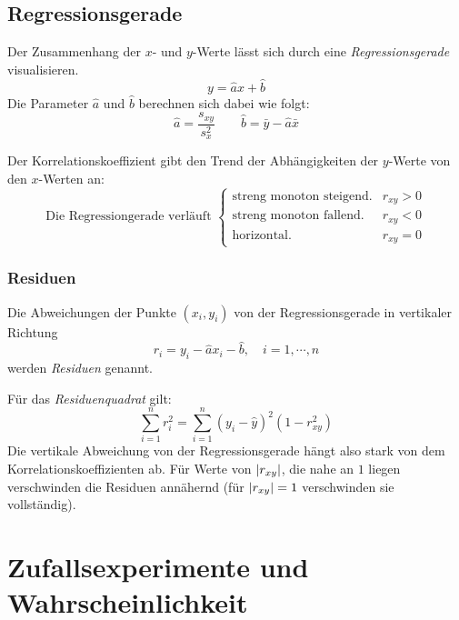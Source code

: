 	\subsection{Regressionsgerade}
		Der Zusammenhang der \(x\)- und \(y\)-Werte lässt sich durch eine \textit{Regressionsgerade} visualisieren.
		\begin{equation*}
			y = \hat{a} x + \hat{b}
		\end{equation*}
		Die Parameter \( \hat{a} \) und \( \hat{b} \) berechnen sich dabei wie folgt:
		\begin{equation*}
			\hat{a} = \frac{s_{xy}}{s_x^2} \qquad \hat{b} = \bar{y} - \hat{a} \bar{x}
		\end{equation*}

		Der Korrelationskoeffizient gibt den Trend der Abhängigkeiten der \(y\)-Werte von den \(x\)-Werten an:
		\begin{equation*}
			\text{Die Regressiongerade verläuft }
			\begin{cases}
				\textrm{streng monoton steigend.} & r_{xy} > 0 \\
				\textrm{streng monoton fallend.}  & r_{xy} < 0 \\
				\textrm{horizontal.}              & r_{xy} = 0
			\end{cases}
		\end{equation*}

		\subsubsection{Residuen}
			Die Abweichungen der Punkte \( (x_i, y_i) \) von der Regressionsgerade in vertikaler Richtung
			\begin{equation*}
				r_i = y_i - \hat{a} x_i - \hat{b}, \quad i = 1, \cdots, n
			\end{equation*}
			werden \textit{Residuen} genannt.

			Für das \textit{Residuenquadrat} gilt:
			\begin{equation*}
				\sum_{i = 1}^{n} r_i^2 = \sum_{i = 1}^{n} (y_i - \hat{y})^2 (1 - r_{xy}^2)
			\end{equation*}
			Die vertikale Abweichung von der Regressionsgerade hängt also stark von dem Korrelationskoeffizienten ab. Für Werte von \( \abs{r_{xy}} \), die nahe an \(1\) liegen verschwinden die Residuen annähernd (für \( \abs{r_{xy}} = 1 \) verschwinden sie vollständig).

\section{Zufallsexperimente und Wahrscheinlichkeit}
